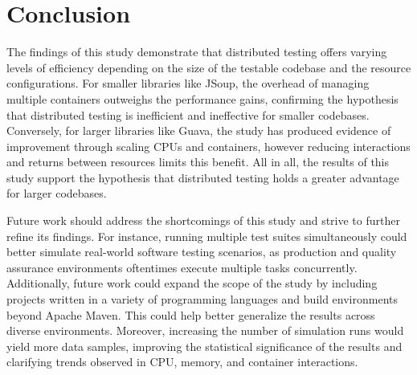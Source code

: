 \section{Conclusion}
\label{Conclusion}

The findings of this study demonstrate that distributed testing offers varying levels of efficiency depending on the size of the testable codebase and the resource configurations. For smaller libraries like JSoup, the overhead of managing multiple containers outweighs the performance gains, confirming the hypothesis that distributed testing is inefficient and ineffective for smaller codebases. Conversely, for larger libraries like Guava, the study has produced evidence of improvement through scaling CPUs and containers, however reducing interactions and returns between resources limits this benefit. All in all, the results of this study support the hypothesis that distributed testing holds a greater advantage for larger codebases.  


Future work should address the shortcomings of this study and strive to further refine its findings. For instance, running multiple test suites simultaneously could better simulate real-world software testing scenarios, as production and quality assurance environments oftentimes execute multiple tasks concurrently. Additionally, future work could expand the scope of the study by including projects written in a variety of programming languages and build environments beyond Apache Maven. This could help better generalize the results across diverse environments. Moreover, increasing the number of simulation runs would yield more data samples, improving the statistical significance of the results and clarifying trends observed in CPU, memory, and container interactions. 
